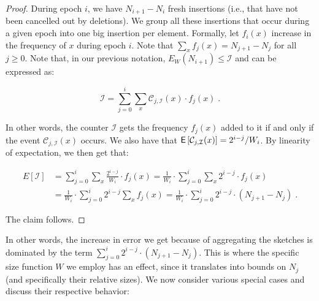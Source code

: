 \documentclass[sigconf]{acmart}
\begin{document}
\begin{proof}
During epoch $i$, we have $N_{i+1}-N_{i}$ fresh insertions (i.e., that have not been cancelled out by deletions). We group all these insertions that occur during a given epoch into one big insertion per element. Formally, let $f_i(x)$ increase in the frequency of $x$ during epoch $i$.  Note that $\sum_x f_j(x) = N_{j+1}-N_j$ for all $j\geq 0$. Note that, in our previous notation, $E_W(N_{i+1}) \leq \mathcal{I}$ and can be expressed as:


$$ \mathcal{I} =\sum_{j=0}^i   \sum_x \mathcal{C}_{j,\mathcal{I}}(x) \cdot f_j(x)   \;.$$

\noindent
In other words, the counter $\mathcal{I}$ gets the frequency $f_j(x)$ added to it if and only if the event $\mathcal{C}_{j,\mathcal{I}}(x)$ occurs. We also have that $\mathsf{E}\left[ \mathcal{C}_{j,\mathcal{I}}(x) \right] = 2^{i-j}/W_i$. By linearity of expectation, we then get that:

\begin{align*}
	E[\mathcal{I}] &= \sum_{j=0}^i   \sum_x \frac{2^{i-j}}{W_i} \cdot f_j(x) = \frac{1}{W_i} \cdot  \sum_{j=0}^i   \sum_x 2^{i-j} \cdot f_j(x)\\
	&=	\frac{1}{W_i} \cdot  \sum_{j=0}^i   2^{i-j}  \sum_x f_j(x) = \frac{1}{W_i} \cdot  \sum_{j=0}^i  2^{i-j} \cdot  (N_{j+1} - N_j) \;.
\end{align*}

The claim follows.
\end{proof}



In other words, the increase in error we get because of aggregating the sketches is dominated by the term $\sum_{j=0}^i  2^{i-j} \cdot  (N_{j+1} - N_j)$. This is where the specific size function $W$ we employ has an effect, since it translates into bounds on $N_j$ (and specifically their relative sizes). We now consider various special cases and discuss their respective behavior:
\end{document}
